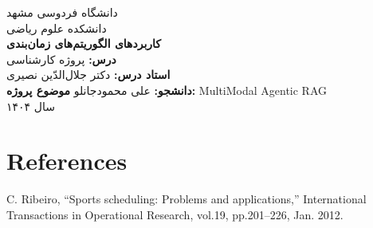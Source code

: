 \documentclass[12pt,a4paper]{article}
\newcommand{\LTRSection}[1]{%
    \LTR\section{\textsf{#1}}
}
\begin{document}
\thispagestyle{empty}
\begin{center}
    \vspace*{2cm}
    \Huge{دانشگاه فردوسی مشهد} \\[0.5cm]
    \Large{دانشکده علوم ریاضی} \\[2cm]
    \Huge{\textbf{کاربردهای الگوریتم‌های زمان‌بندی}} \\[2cm]
    \Large{
        \textbf{درس:} پروژه کارشناسی \\
        \textbf{استاد درس:} دکتر جلال‌الدّین نصیری
    } \\[2cm]
    \Large{
        \textbf{دانشجو:} علی محمودجانلو
        \textbf{موضوع پروژه:} MultiModal Agentic RAG
    } \\[3cm]
    \Large{سال ۱۴۰۴}
\end{center}

\newpage

\thispagestyle{empty}
\hypersetup{linkcolor=blue}
\tableofcontents
\newpage




\newpage
\LTRSection{References}
\begin{thebibliography}{10}
     C. Ribeiro, “Sports scheduling: Problems and applications,” International Transactions in Operational Research, vol.19, pp.201–226, Jan. 2012.
\end{thebibliography}
\end{document}

